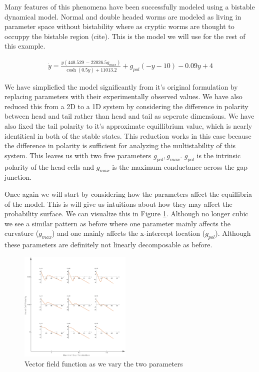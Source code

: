 \documentclass[letterpaper]{article}
\begin{document}
Many features of this phenomena have been successfully modeled using a bistable dynamical
model. Normal and double headed worms are modeled as living in parameter space without
bistability where as cryptic worms are thought to occuppy the bistable region (cite). 
This is the model we will use for the rest of this example.

\begin{eqnarray}
  \dot{y} = \frac{y (440.529\, -22026.5 g_{max})}{\cosh (0.5 y)+11013.2}
  +g_{pol} (-y-10)-0.09 y+4
\end{eqnarray}

We have simpliefied the model significantly from it's original formulation by replacing
parameters with their experimentally observed values. We have also reduced this from a 
2D to a 1D system by considering the difference in polarity 
between head and tail rather
than head and tail as seperate dimensions. We have also fixed the tail polarity to
it's approximate equillibrium value, which is nearly identitical in both of the stable
states. 
This reduction works in this case 
because the difference
in polarity is sufficient for analyzing the multistability of this system.
This leaves us with two free parameters
$g_{pol},g_{max}$. $g_{pol}$ is the intrinsic polarity of the head cells
and $g_{max}$ is the maximum conductance across the gap junction.

Once again we will start by considering how the parameters affect the equillibria of
the model. This is will give us intuitions about how they may affect the probability
surface. We can visualize this in Figure \ref{fig7}. Although no longer cubic we 
see a similar pattern as before where one parameter mainly affects the curvature 
($g_{max}$)
and one mainly affects the x-intercept location ($g_{pol}$). 
Although these parameters are 
definitely not linearly decomposable as before.

\begin{figure}[t]
\begin{center}
\includegraphics[width=2.1in,angle=0]{./worm_params.png}
\caption{Vector field function as we vary the two parameters}
\label{fig7}
\end{center}
\end{figure}
\end{document}
